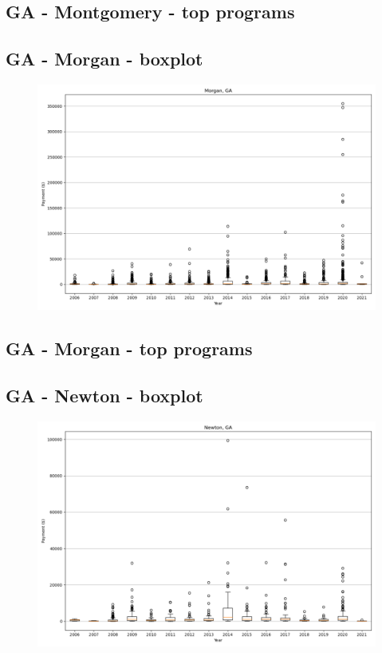 \subsection*{GA - Montgomery - top programs}

\newpage
\subsection*{GA - Morgan - boxplot}
\begin{figure}[h]
\centering
\includegraphics[width=7in]{../output/boxplots/counties/Morgan-GA_boxplot.png}
\end{figure}


\subsection*{GA - Morgan - top programs}

\newpage
\subsection*{GA - Newton - boxplot}
\begin{figure}[h]
\centering
\includegraphics[width=7in]{../output/boxplots/counties/Newton-GA_boxplot.png}
\end{figure}


